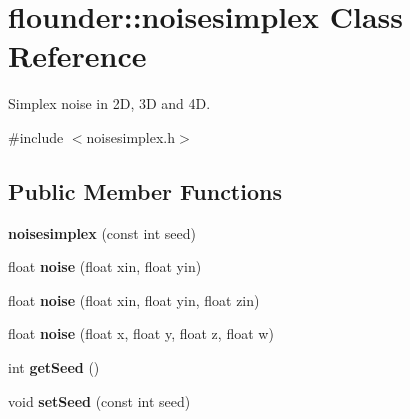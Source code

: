 \hypertarget{classflounder_1_1noisesimplex}{}\section{flounder\+:\+:noisesimplex Class Reference}
\label{classflounder_1_1noisesimplex}


Simplex noise in 2D, 3D and 4D.  




{\ttfamily \#include $<$noisesimplex.\+h$>$}

\subsection*{Public Member Functions}
\begin{DoxyCompactItemize}
\item 
\mbox{\label{classflounder_1_1noisesimplex_a22e17d813fd70497f294344c1834239b}} 
{\bfseries noisesimplex} (const int seed)
\item 
\mbox{\label{classflounder_1_1noisesimplex_aa238d0f0df567cfaa4a32b9cbe433f06}} 
float {\bfseries noise} (float xin, float yin)
\item 
\mbox{\label{classflounder_1_1noisesimplex_a7c076b9c7f98e30c4b0685bd2782c345}} 
float {\bfseries noise} (float xin, float yin, float zin)
\item 
\mbox{\label{classflounder_1_1noisesimplex_a17a8de3a1025193bb185835802098469}} 
float {\bfseries noise} (float x, float y, float z, float w)
\item 
\mbox{\label{classflounder_1_1noisesimplex_a31baac1a497354373db006c85f44090f}} 
int {\bfseries get\+Seed} ()
\item 
\mbox{\label{classflounder_1_1noisesimplex_a01e295347a6d11070383f0d4a393f489}} 
void {\bfseries set\+Seed} (const int seed)
\end{DoxyCompactItemize}
